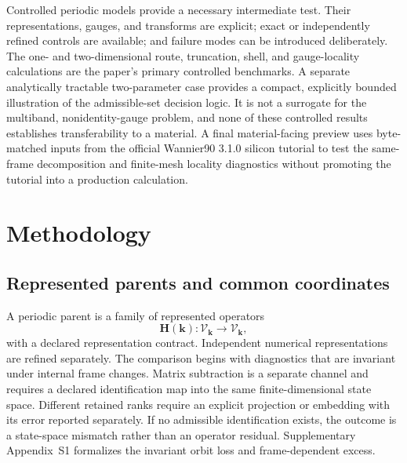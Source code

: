 \documentclass[preprint,12pt]{elsarticle}
\begin{document}
Controlled periodic models provide a necessary intermediate test. Their
representations, gauges, and transforms are explicit; exact or independently
refined controls are available; and failure modes can be introduced
deliberately. The one- and two-dimensional route, truncation, shell, and
gauge-locality calculations are the paper's primary controlled benchmarks. A
separate analytically tractable two-parameter case provides a compact,
explicitly bounded illustration of the admissible-set decision logic. It is not
a surrogate for the multiband, nonidentity-gauge problem, and none of these
controlled results establishes transferability to a material. A final
material-facing preview uses byte-matched inputs from the official Wannier90
3.1.0 silicon tutorial to test the same-frame decomposition and finite-mesh
locality diagnostics without promoting the tutorial into a production
calculation.

\section{Methodology}
\label{sec:methodology}

\subsection{Represented parents and common coordinates}
\label{sec:represented-parents}

A periodic parent is a family of represented operators
\begin{equation}
 \bm{H}(\bm{k}):\mathcal{V}_{\bm{k}}\rightarrow\mathcal{V}_{\bm{k}},
 \label{eq:bloch-family}
\end{equation}
with a declared representation contract. Independent numerical
representations are refined separately. The comparison begins with diagnostics
that are invariant under internal frame changes. Matrix subtraction is a
separate channel and requires a declared identification map into the same
finite-dimensional state space. Different retained ranks require an explicit
projection or embedding with its error reported separately. If no admissible
identification exists, the outcome is a state-space mismatch rather than an
operator residual. Supplementary Appendix~S1 formalizes the invariant orbit
loss and frame-dependent excess.
\end{document}
